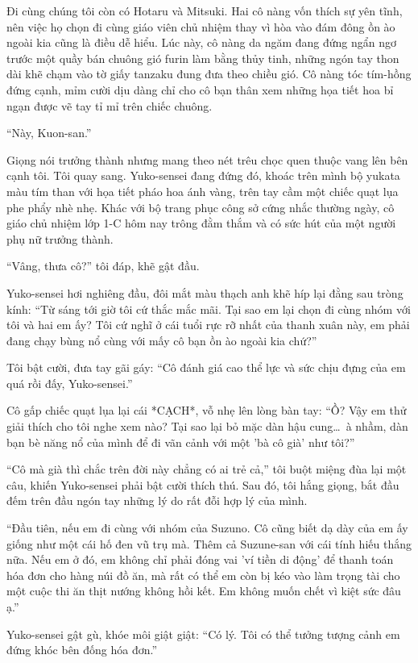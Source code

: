 \documentclass[../main.tex]{subfiles}
\begin{document}
Đi cùng chúng tôi còn có Hotaru và Mitsuki. Hai cô nàng vốn thích sự yên tĩnh, nên việc họ chọn đi cùng giáo viên chủ nhiệm thay vì hòa vào đám đông ồn ào ngoài kia cũng là điều dễ hiểu. Lúc này, cô nàng da ngăm đang đứng ngẩn ngơ trước một quầy bán chuông gió furin làm bằng thủy tinh, những ngón tay thon dài khẽ chạm vào tờ giấy tanzaku đung đưa theo chiều gió. Cô nàng tóc tím-hồng đứng cạnh, mỉm cười dịu dàng chỉ cho cô bạn thân xem những họa tiết hoa bỉ ngạn được vẽ tay tỉ mỉ trên chiếc chuông.

``Này, Kuon-san.''

Giọng nói trưởng thành nhưng mang theo nét trêu chọc quen thuộc vang lên bên cạnh tôi. Tôi quay sang. Yuko-sensei đang đứng đó, khoác trên mình bộ yukata màu tím than với họa tiết pháo hoa ánh vàng, trên tay cầm một chiếc quạt lụa phe phẩy nhè nhẹ. Khác với bộ trang phục công sở cứng nhắc thường ngày, cô giáo chủ nhiệm lớp 1-C hôm nay trông đằm thắm và có sức hút của một người phụ nữ trưởng thành.

``Vâng, thưa cô?'' tôi đáp, khẽ gật đầu.

Yuko-sensei hơi nghiêng đầu, đôi mắt màu thạch anh khẽ híp lại đằng sau tròng kính: ``Từ sáng tới giờ tôi cứ thắc mắc mãi. Tại sao em lại chọn đi cùng nhóm với tôi và hai em ấy? Tôi cứ nghĩ ở cái tuổi rực rỡ nhất của thanh xuân này, em phải đang chạy bùng nổ cùng với mấy cô bạn ồn ào ngoài kia chứ?''

Tôi bật cười, đưa tay gãi gáy: ``Cô đánh giá cao thể lực và sức chịu đựng của em quá rồi đấy, Yuko-sensei.''

Cô gấp chiếc quạt lụa lại cái *CẠCH*, vỗ nhẹ lên lòng bàn tay: ``Ồ? Vậy em thử giải thích cho tôi nghe xem nào? Tại sao lại bỏ mặc dàn hậu cung\dots\ à nhầm, dàn bạn bè năng nổ của mình để đi vãn cảnh với một 'bà cô già' như tôi?''

``Cô mà già thì chắc trên đời này chẳng có ai trẻ cả,'' tôi buột miệng đùa lại một câu, khiến Yuko-sensei phải bật cười thích thú. Sau đó, tôi hắng giọng, bắt đầu đếm trên đầu ngón tay những lý do rất đỗi hợp lý của mình.

``Đầu tiên, nếu em đi cùng với nhóm của Suzuno. Cô cũng biết dạ dày của em ấy giống như một cái hố đen vũ trụ mà. Thêm cả Suzune-san với cái tính hiếu thắng nữa. Nếu em ở đó, em không chỉ phải đóng vai 'ví tiền di động' để thanh toán hóa đơn cho hàng núi đồ ăn, mà rất có thể em còn bị kéo vào làm trọng tài cho một cuộc thi ăn thịt nướng không hồi kết. Em không muốn chết vì kiệt sức đâu ạ.''

Yuko-sensei gật gù, khóe môi giật giật: ``Có lý. Tôi có thể tưởng tượng cảnh em đứng khóc bên đống hóa đơn.''
\end{document}

